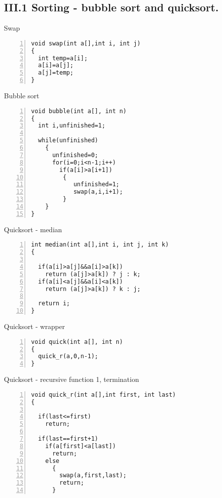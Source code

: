 \documentclass{beamer}
\begin{document}
\subsection*{III.1 Sorting - bubble sort and quicksort.}
\begin{frame}[fragile]{Swap}
\begin{lstlisting}[numbers=left]
void swap(int a[],int i, int j)
{
  int temp=a[i];
  a[i]=a[j];
  a[j]=temp;
}
\end{lstlisting}
\end{frame}

\begin{frame}[fragile]{Bubble sort}
\begin{lstlisting}[numbers=left]
void bubble(int a[], int n)
{
  int i,unfinished=1;
  
  while(unfinished)
    {
      unfinished=0;
      for(i=0;i<n-1;i++)
        if(a[i]>a[i+1])
         {
            unfinished=1;
            swap(a,i,i+1);	    
         }
    }
}
\end{lstlisting}
\end{frame}

\begin{frame}[fragile]{Quicksort - median}
\begin{lstlisting}[numbers=left]
int median(int a[],int i, int j, int k)
{

  if(a[i]>a[j]&&a[i]>a[k])
    return (a[j]>a[k]) ? j : k;
  if(a[i]<a[j]&&a[i]<a[k])
    return (a[j]>a[k]) ? k : j;

  return i;
}
\end{lstlisting}
\end{frame}



\begin{frame}[fragile]{Quicksort - wrapper}
\begin{lstlisting}[numbers=left]
void quick(int a[], int n)
{
  quick_r(a,0,n-1);
}
\end{lstlisting}
\end{frame}

\begin{frame}[fragile]{Quicksort - recursive function 1, termination}
\begin{lstlisting}[numbers=left]
void quick_r(int a[],int first, int last)
{

  if(last<=first)
    return;

  if(last==first+1)
    if(a[first]<a[last])
      return;
    else
      {
        swap(a,first,last);
        return;
      }
\end{lstlisting}
\end{frame}
\end{document}
